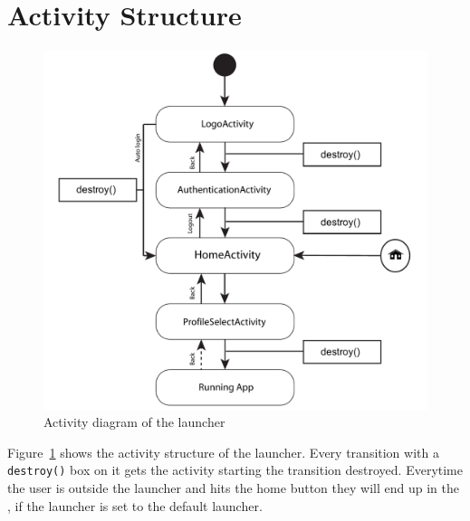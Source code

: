 \section{Activity Structure}


\begin{figure}[h!]
	\centering
	\includegraphics[width=1\textwidth]{gfx/activityDiagram.pdf}
	\caption{Activity diagram of the launcher}
	\label{fig:activity_diagram}
\end{figure}

Figure~\ref{fig:activity_diagram} shows the activity structure of the \giraf[] launcher. Every transition with a \verb+destroy()+ box on it gets the activity starting the transition destroyed. Everytime the user is outside the launcher and hits the home button they will end up in the , if the \giraf[] launcher is set to the default launcher.